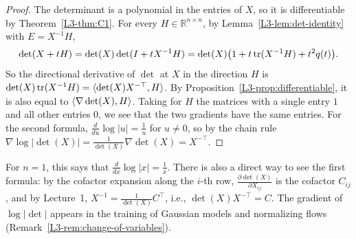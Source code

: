 \begin{proof}
    The determinant is a polynomial in the entries of $X$, so it is differentiable by Theorem~\ref{L3-thm:C1}. For every $H \in \mathbb{R}^{n \times n}$, by Lemma~\ref{L3-lem:det-identity} with $E = X^{-1}H$,
    \[\det(X + tH) = \det(X)\det(I + tX^{-1}H) = \det(X)\big(1 + t\operatorname{tr}(X^{-1}H) + t^2 q(t)\big).\]
    So the directional derivative of $\det$ at $X$ in the direction $H$ is $\det(X)\operatorname{tr}(X^{-1}H) = \langle \det(X) X^{-\top}, H \rangle$. By Proposition~\ref{L3-prop:differentiable}, it is also equal to $\langle \nabla \det(X), H \rangle$. Taking for $H$ the matrices with a single entry $1$ and all other entries $0$, we see that the two gradients have the same entries. For the second formula, $\frac{d}{du}\log|u| = \frac{1}{u}$ for $u \neq 0$, so by the chain rule $\nabla \log|\det(X)| = \frac{1}{\det(X)} \nabla\det(X) = X^{-\top}$.
\end{proof}

For $n = 1$, this says that $\frac{d}{dx}\log|x| = \frac{1}{x}$. There is also a direct way to see the first formula: by the cofactor expansion along the $i$-th row, $\frac{\partial \det(X)}{\partial X_{ij}}$ is the cofactor $C_{ij}$, and by Lecture~1, $X^{-1} = \frac{1}{\det(X)}C^\top$, i.e., $\det(X)X^{-\top} = C$. The gradient of $\log|\det|$ appears in the training of Gaussian models and normalizing flows (Remark~\ref{L3-rem:change-of-variables}).

